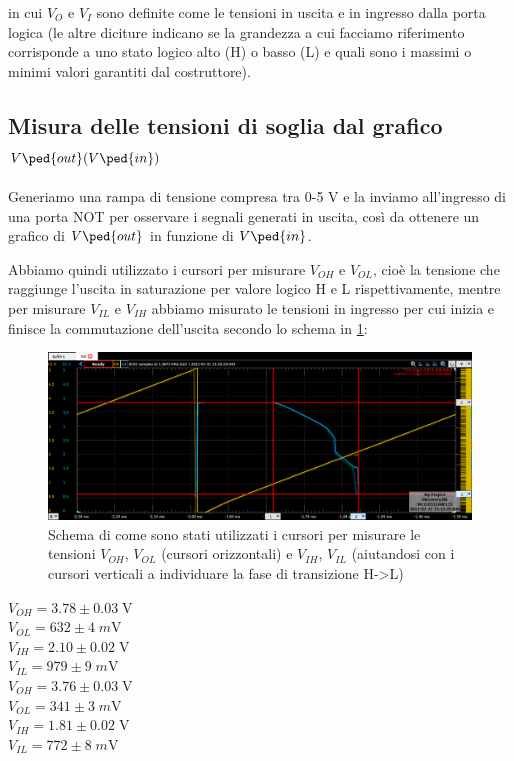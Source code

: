 \documentclass[10pt, a4paper, italian]{article}
\begin{document}
in cui $V_O$ e $V_I$ sono definite come le tensioni in uscita e in ingresso
dalla porta logica (le altre diciture indicano se la grandezza a cui facciamo
riferimento corrisponde a uno stato logico alto (H) o basso (L) e quali sono
i massimi o minimi valori garantiti dal costruttore).

\subsection{Misura delle tensioni di soglia dal grafico
$V\ped{out}(V\ped{in})$}
Generiamo una rampa di tensione compresa tra 0-5 V e la inviamo
all'ingresso di una porta NOT per osservare i segnali generati in uscita,
così da ottenere un grafico di $V\ped{out}$ in funzione di $V\ped{in}$.

Abbiamo quindi utilizzato i cursori per misurare $V_{OH}$ e $V_{OL}$, cioè
la tensione che raggiunge l'uscita in saturazione per valore logico H e L
rispettivamente, mentre per misurare $V_{IL}$ e $V_{IH}$ abbiamo misurato le
tensioni in ingresso per cui inizia e finisce la commutazione dell'uscita
secondo lo schema in \cref{fig: trans}:
\begin{figure}[htbp]
\centering
	\includegraphics[width=\textwidth]{trans}
	\caption{Schema di come sono stati utilizzati i cursori per misurare le tensioni $V_{OH}$, $V_{OL}$ (cursori orizzontali) e $V_{IH}$, $V_{IL}$ (aiutandosi con i cursori verticali a individuare la fase di transizione H->L)}
	\label{fig: trans}
\end{figure}
\begin{multicols}{2}
    \centering
    $V_{OH} = 3.78 \pm 0.03\; \si{\V}$ \\
	$V_{OL} = 632 \pm 4 \; \si{m\V}$ \\
	$V_{IH} = 2.10 \pm 0.02 \; \si{\V} $\\
	$V_{IL} = 979 \pm 9\; \si{m\V} $\\
    
    $V_{OH} = 3.76 \pm 0.03\; \si{\V}$ \\
	$V_{OL} = 341 \pm 3 \; \si{m\V}$ \\
	$V_{IH} = 1.81 \pm 0.02 \; \si{\V} $\\
	$V_{IL} = 772 \pm 8\; \si{m\V} $\\
\end{multicols}
\end{document}
